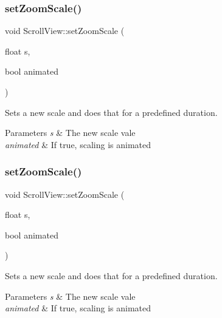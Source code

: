 \subsubsection{\texorpdfstring{set\+Zoom\+Scale()}{setZoomScale()}\hspace{0.1cm}{\footnotesize\ttfamily [1/2]}}
{\footnotesize\ttfamily void Scroll\+View\+::set\+Zoom\+Scale (\begin{DoxyParamCaption}\item[{float}]{s,  }\item[{bool}]{animated }\end{DoxyParamCaption})}

Sets a new scale and does that for a predefined duration.


\begin{DoxyParams}{Parameters}
{\em s} & The new scale vale \\
\hline
{\em animated} & If true, scaling is animated \\
\hline
\end{DoxyParams}
\mbox{\label{classScrollView_a9c9101d58eeb922bfe64b9b4cd01b314}} 
\subsubsection{\texorpdfstring{set\+Zoom\+Scale()}{setZoomScale()}\hspace{0.1cm}{\footnotesize\ttfamily [2/2]}}
{\footnotesize\ttfamily void Scroll\+View\+::set\+Zoom\+Scale (\begin{DoxyParamCaption}\item[{float}]{s,  }\item[{bool}]{animated }\end{DoxyParamCaption})}

Sets a new scale and does that for a predefined duration.


\begin{DoxyParams}{Parameters}
{\em s} & The new scale vale \\
\hline
{\em animated} & If true, scaling is animated \\
\hline
\end{DoxyParams}
\mbox{\label{classScrollView_a04c9d8527dc9a0b883324c90d5b30ae2}} 
